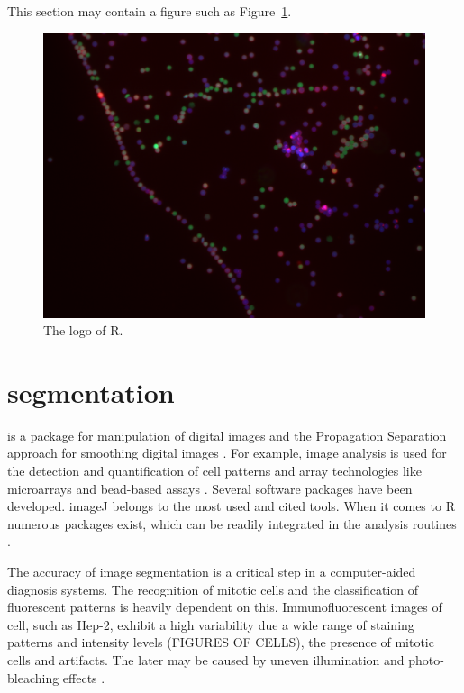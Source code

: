 This section may contain a figure such as Figure~\ref{figure:bead}.

\begin{figure}[htbp]
  \centering
  \includegraphics[clip=true,trim=0.1cm 0.3cm 0.2cm 0.1cm, width=12cm]{bead}
  \caption{The logo of R.}
  \label{figure:bead}
\end{figure}

\section{segmentation}

\citep{holmes_interactive_2009}

 is a package for manipulation of digital images and the 
Propagation Separation approach for smoothing digital images \citep{polzehl_adaptive_2007}.
For example, image analysis is used for the detection and quantification of 
cell patterns and array technologies like microarrays and bead-based assays 
\citep{rodiger_highly_2013, willitzki_new_2012, willitzki_fully_2013, 
dunning_beadarray:_2006}.
Several software packages have been developed. imageJ belongs to the most 
used and cited tools. When it comes to R numerous packages exist, which can 
be readily integrated in the analysis routines \citep{frery_introduction_2013}.

The accuracy of image segmentation is a critical step in a computer-aided 
diagnosis systems. The recognition of mitotic cells and the classification of 
fluorescent patterns is heavily dependent on this. Immunofluorescent images 
of cell, such as Hep-2, exhibit a high variability due a wide range of staining 
patterns and intensity levels (FIGURES OF CELLS), the presence of mitotic 
cells and  artifacts. The later may be caused by uneven illumination and 
photo-bleaching effects \citep{tonti_automated_2015}.

